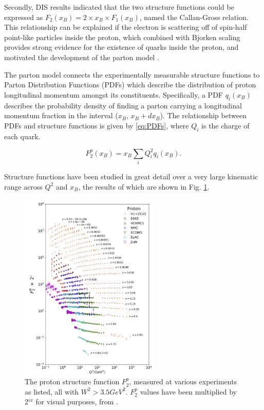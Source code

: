         Secondly, DIS results indicated that the two structure functions could be expressed as $F_2(x_B) = 2\times x_B\times F_1(x_B)$, named the Callan-Gross relation. This relationship can be explained if the electron is scattering off of spin-half point-like particles inside the proton, which combined with Bjorken scaling provides strong evidence for the existence of quarks inside the proton, and motivated the development of the parton model \parencite{Feynman1969VeryHadrons}.

        
        
        The parton model connects the experimentally measurable structure functions to Parton Distribution Functions (PDFs) which describe the distribution of proton longitudinal momentum amongst its constituents. Specifically, a PDF $q_i(x_B)$ describes the probability density of finding a parton carrying a longitudinal momentum fraction in the interval ($x_B$, $x_B + dx_B$). The relationship between PDFs and structure functions is given by \eqref{eq:PDFs}, where $Q_i$ is the charge of each quark.

        \begin{equation}\label{eq:PDFs}
            F_2^p(x_B) = x_B \sum_i Q^2_i q_i(x_B).
        \end{equation}
        
        Structure functions have been studied in great detail over a very large kinematic range across $Q^2$ and $x_B$, the results of which are shown in Fig. \ref{fig:HERA}.
    
        
        \begin{figure}[H]
            \centering
            \includegraphics[width=0.6\textwidth]{Chapters/Ch1-Intro/Ch1-Sec1-Background/pics/inelastic-ep/protF2.png}
            \caption[Proton Structure Function $F^p_2$]{The proton structure function $F^p_2$, measured at various experiments as listed, all with $W^2>3.5 GeV^2$. $F^p_2$ values have been multiplied by 2$^{ix}$ for visual purposes, from \parencite{Zyla2020ReviewPhysics}.}
            \label{fig:HERA}
        \end{figure}

